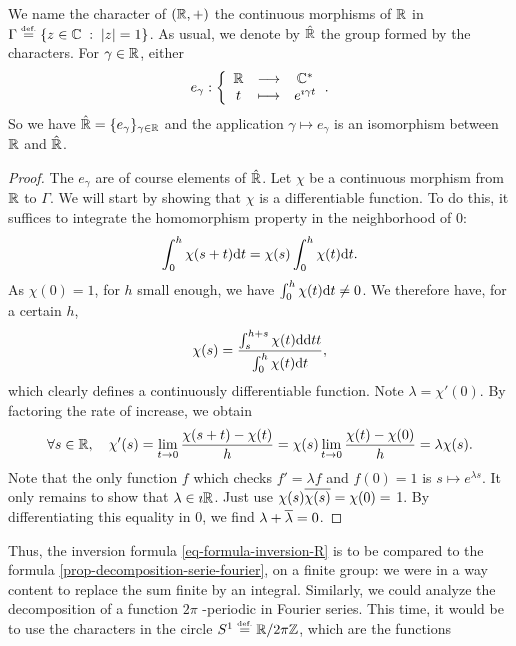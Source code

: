 \begin{prop}
\label{prop-characters-r}
 \label{notation-52} We name the character of $ (\mathbb{R}, +) $ the continuous morphisms of $ \mathbb{R} $ in $ \Gamma \stackrel{\mbox{\upshape\tiny def.}}{=} \left\{ z \in \mathbb{C} \;:\; | z | = 1 \right\} $. As usual, we denote by $ \hat{\mathbb{R}} $ the group formed by the characters. For $ \gamma \in \mathbb{R} $, either
\begin{equation*}
e_{\gamma}: {\left\{ \begin{array}{ccc} \mathbb{R} & \longrightarrow & \mathbb{C}^* \\ t & \longmapsto & e^{\imath \gamma t} \end{array} \right.}.
\end{equation*}
So we have $ \hat{\mathbb{R}} = \{e_{\gamma} \}_{\gamma \in \mathbb{R}} $ and the application $ \gamma \mapsto e_{\gamma} $ is an isomorphism between $ \mathbb{R} $ and $ \hat{\mathbb{R}} $.
\end{prop}
\begin{proof}
The $ e_{\gamma} $ are of course elements of $ \hat{\mathbb{R}} $. Let $ \chi $ be a continuous morphism from $ \mathbb{R} $ to $ \Gamma $. We will start by showing that $ \chi $ is a differentiable function. To do this, it suffices to integrate the homomorphism property in the neighborhood of $ 0 $:
\begin{equation*}
\int_0^h{\chi (s + t) \mathrm{d} t} = \chi (s) \int_0^h{\chi (t) \mathrm{d} t}.
\end{equation*}
As $ \chi (0) = 1 $, for $ h $ small enough, we have $ \int_0^h{\chi (t) \mathrm{d} t} \neq 0 $. We therefore have, for a certain $ h $,
\begin{equation*}
\chi (s) = \frac{\int_s^{h + s}{\chi (t) \mathrm{d} \mathrm{d} tt}}{\int_0^h{\chi (t) \mathrm{d} t}},
\end{equation*}
which clearly defines a continuously differentiable function. Note $ \lambda = \chi'(0) $. By factoring the rate of increase, we obtain
\begin{equation*}
\forall s \in \mathbb{R}, \quad \chi'(s) = \lim_{t \rightarrow 0}{\frac{\chi (s + t) - \chi (t)}{h}} = \chi (s) \lim_{t \rightarrow 0}{\frac{\chi (t) - \chi (0)}{h}} = \lambda \chi (s).
\end{equation*}
Note that the only function $ f $ which checks $ f'= \lambda f $ and $ f(0) = 1 $ is $ s \mapsto e^{\lambda s} $. It only remains to show that $ \lambda \in \imath \mathbb{R} $. Just use $ \chi (s) \overline{\chi (s)} = \chi (0) = $ 1. By differentiating this equality in 0, we find $ \lambda + \overline{\lambda} = 0 $.
\end{proof}
Thus, the inversion formula \eqref{eq-formula-inversion-R} is to be compared to the formula \eqref{prop-decomposition-serie-fourier}, on a finite group: we were in a way content to replace the sum finite by an integral. Similarly, we could analyze the decomposition of a function $ 2 \pi $ -periodic in Fourier series. This time, it would be to use the characters in the circle $ S^1 \stackrel{\mbox{\upshape\tiny def.}}{=} \mathbb{R} / 2 \pi \mathbb{Z} $, which are the functions
